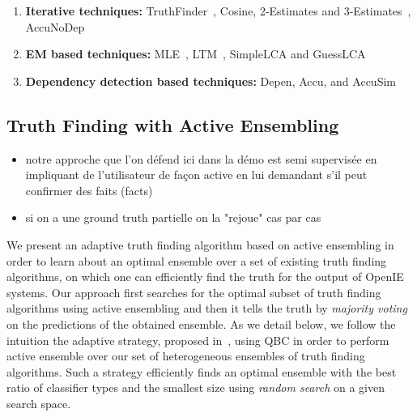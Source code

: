 \begin{enumerate}
 \item \textbf{Iterative techniques:} TruthFinder~\cite{YinHY08}, Cosine, 2-Estimates and 3-Estimates~\cite{GallandAMS10}, 
 AccuNoDep~\cite{DongBS09}
 \item \textbf{EM based techniques:} MLE~\cite{WangKLA12}, LTM~\cite{ZhaoRGH12}, SimpleLCA and GuessLCA~\cite{PasternackR13}
 \item \textbf{Dependency detection based techniques:} Depen, Accu, and AccuSim~\cite{DongBS09}
\end{enumerate}



\subsection{Truth Finding with Active Ensembling}
\begin{itemize}
 \item notre approche que l'on défend ici dans la démo est  semi supervisée en impliquant de l'utilisateur de façon active
en lui demandant s'il peut confirmer des faits (facts)
\item si on a une ground truth partielle on la "rejoue" cas par cas
\end{itemize}

\medskip

We present an adaptive truth finding algorithm based on active ensembling in order to learn about an optimal
ensemble over a set of existing truth finding algorithms, on which one can efficiently find the truth for the output 
of OpenIE systems. Our approach first searches for the optimal subset of truth finding algorithms using active ensembling and then it 
tells the truth by \emph{majority voting} on the predictions of the obtained ensemble. As we detail below, we follow the intuition
the adaptive strategy, proposed in~\cite{Lu15}, using QBC in order to perform active ensemble over our set of heterogeneous 
ensembles of truth finding algorithms. Such a strategy efficiently finds an optimal ensemble with the best ratio of classifier
types and the smallest size using \emph{random search} on a given search space.


